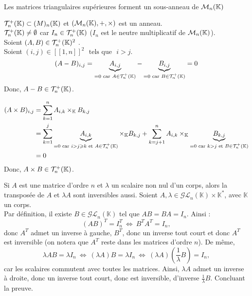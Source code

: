 \documentclass{article}
\renewenvironment{question_kholle}[2][ ]
{
	\subsection{\texorpdfstring{#2}{}}
	\notblank{#1}
	{
		\noindent #1
		\bigbreak
	}
	{}
	\begin{proof}
}
{
	\end{proof}
}
\begin{document}
	\begin{question_kholle}
		{Les matrices triangulaires supérieures forment un sous-anneau de $\mathcal{M}_n(\mathbb K)$}
		
		$\mathcal{T}_n^+(\mathbb K) \subset \mathcal(M)_n(\mathbb K)$ et $(\mathcal{M}_n(\mathbb K), +, \times)$ est un anneau. \\
		$\mathcal{T}_n^+(\mathbb K) \neq \emptyset$ car $I_n \in \mathcal{T}_n^+(\mathbb K)$ ($I_n$ est le neutre multiplicatif de $\mathcal{M}_n(\mathbb K)$). \\
		Soient $(A, B) \in \mathcal{T}_n^+(\mathbb K)^2$ . \\
		Soient $(i, j) \in [\![1,n]\!]^2$ $\text{ tels que }$ $i > j$.
		\begin{equation*}
			(A - B)_{i,j}
			= \underbrace{A_{i,j}}_{=0 \text{ car } A \in \mathcal{T}_n^+(\mathbb K)} - \underbrace{B_{i,j}}_{=0 \text{ car } B \in \mathcal{T}_n^+(\mathbb K)}
			= 0
		\end{equation*}
		Donc, $A - B \in \mathcal{T}_n^+(\mathbb K)$.
		
		\begin{equation*}
			\begin{aligned}
				(A \times B)_{i,j}
				&= \sum_{k=1}^{n} A_{i,k} \times_{\mathbb K} B_{k,j} \\
				&= \sum_{k=1}^{j} \underbrace{A_{i,k}}_{=0 \text{ car } i > j \geqslant k \text{ et } A \in \mathcal{T}_n^+(\mathbb K)} \times_{\mathbb K} B_{k,j}
				+ \sum_{k=j+1}^{n} A_{i,k} \times_{\mathbb K} \underbrace{B_{k,j}}_{=0 \text{ car } k > j \text{ et } B \in \mathcal{T}_n^+(\mathbb K)} \\
				&= 0
			\end{aligned}
		\end{equation*}
		Donc, $A \times B \in \mathcal{T}_n^+(\mathbb K)$.
	\end{question_kholle}
 
	\begin{question_kholle}
		{Si $A$ est une matrice d'ordre $n$ et $\lambda$ un scalaire non nul d'un corps, alors la transposée de $A$ et $\lambda A$ sont inversibles aussi.}
		Soient $A,\lambda \in \mathcal{GL}_n(\mathbb{K})\times \mathbb{K}^*$, avec $\mathbb{K}$ un corps. \\
		Par définition, il existe $B\in \mathcal{GL}_n(\mathbb{K})$ tel que $AB=BA=I_n$. Ainsi : 
		\[
		(AB)^T = I_n^T \ \iff \ B^TA^T = I_n,
		\]
		donc $A^T$ admet un inverse à gauche, $B^T$, donc un inverse tout court et donc $A^T$ est inversible (on notera que $A^T$ reste dans les matrices d'ordre $n$). De même, 
		\[
		\lambda AB = \lambda I_n \ \iff \ (\lambda A)B = \lambda I_n \ \iff \ (\lambda A) \left(\frac{1}{\lambda}B \right) = I_n, 
		\]
		car les scalaires commutent avec toutes les matrices. Ainsi, $\lambda A$ admet un inverse à droite, donc un inverse tout court, donc est inversible, d'inverse $\frac{1}{\lambda}B$. Concluant la preuve.    
	\end{question_kholle}
	
\end{document}
